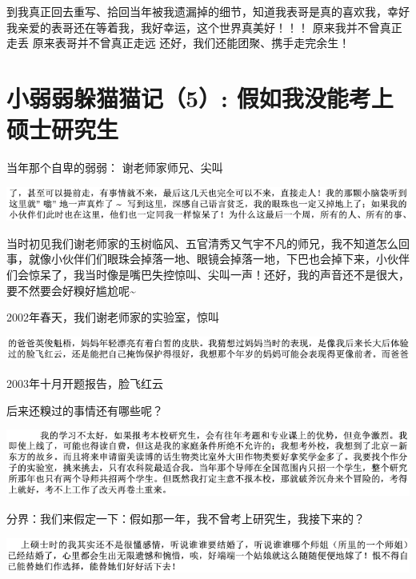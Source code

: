 \documentclass[9pt, b5paper]{article}
\begin{document}
到我真正回去重写、拾回当年被我遗漏掉的细节，知道我表哥是真的喜欢我，幸好我亲爱的表哥还在等着我，我好幸运，这个世界真美好！！！
  原来我并不曾真正走丢
  原来表哥并不曾真正走远
还好，我们还能团聚、携手走完余生！
\section{小弱弱躲猫猫记（5）: 假如我没能考上硕士研究生}
\label{sec:orgda67081}

当年那个自卑的弱弱：   谢老师家师兄、尖叫

\begin{center}
\includegraphics[width=.9\linewidth]{./pic/backups_plans_20210422_115150.png}
\end{center}

当时初见我们谢老师家的玉树临风、五官清秀又气宇不凡的师兄，我不知道怎么回事，就像小伙伴们们眼珠会掉落一地、眼镜会掉落一地，下巴也会掉下来，小伙伴们会惊呆了，我当时像是嘴巴失控惊叫、尖叫一声！还好，我的声音还不是很大，要不然要会好糗好尴尬呢\textasciitilde{}

2002年春天，我们谢老师家的实验室，惊叫

\begin{center}
\includegraphics[width=.9\linewidth]{./pic/backups_plans_20210422_110008.png}
\end{center}

2003年十月开题报告，脸飞红云

后来还糗过的事情还有哪些呢？

\begin{center}
\includegraphics[width=.9\linewidth]{./pic/backups_plans_20210422_095355.png}
\end{center}

分界：我们来假定一下：假如那一年，我不曾考上研究生，我接下来的？

\begin{center}
\includegraphics[width=.9\linewidth]{./pic/backups_plans_20210422_182503.png}
\end{center}
\end{document}
